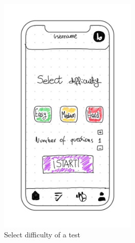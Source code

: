 \begin{figure}[H]
\begin{subfigure}[T]{0.33\textwidth}
        \includegraphics[width=0.72\textwidth]{assets/screens/quiz/common/Select difficulty.png}
        \caption{Select difficulty of a test}
        \label{fig:design_screen_select_dif}
    \end{subfigure}
    \hfill
    \begin{subfigure}[T]{0.33\textwidth}
        \centering

\end{subfigure}
\end{figure}
